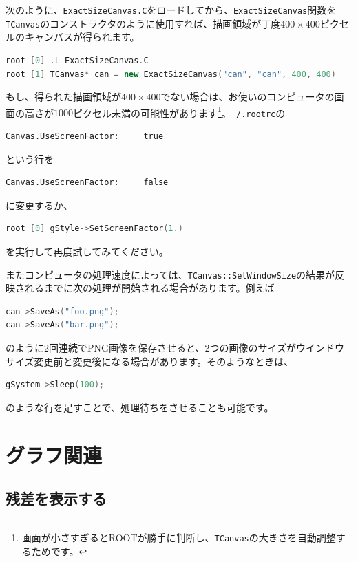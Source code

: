 次のように、\texttt{ExactSizeCanvas.C}をロードしてから、\texttt{ExactSizeCanvas}関数を\texttt{TCanvas}のコンストラクタのように使用すれば、描画領域が丁度$400\times400$ピクセルのキャンバスが得られます。
\begin{lstlisting}[language=C++]
root [0] .L ExactSizeCanvas.C
root [1] TCanvas* can = new ExactSizeCanvas("can", "can", 400, 400)
\end{lstlisting}
もし、得られた描画領域が$400\times400$でない場合は、お使いのコンピュータの画面の高さが$1000$ピクセル未満の可能性があります\footnote{画面が小さすぎるとROOTが勝手に判断し、\texttt{TCanvas}の大きさを自動調整するためです。}。\texttt{~/.rootrc}の
\begin{lstlisting}
Canvas.UseScreenFactor:     true
\end{lstlisting}
という行を
\begin{lstlisting}
Canvas.UseScreenFactor:     false
\end{lstlisting}
に変更するか、
\begin{lstlisting}[language=C++]
root [0] gStyle->SetScreenFactor(1.)
\end{lstlisting}
を実行して再度試してみてください。

またコンピュータの処理速度によっては、\texttt{TCanvas::SetWindowSize}の結果が反映されるまでに次の処理が開始される場合があります。例えば
\begin{lstlisting}[language=C++]
can->SaveAs("foo.png");
can->SaveAs("bar.png");
\end{lstlisting}
のように2回連続でPNG画像を保存させると、2つの画像のサイズがウインドウサイズ変更前と変更後になる場合があります。そのようなときは、
\begin{lstlisting}[language=C++]
gSystem->Sleep(100);
\end{lstlisting}
のような行を足すことで、処理待ちをさせることも可能です。

\section{グラフ関連}
\subsection{残差を表示する}

